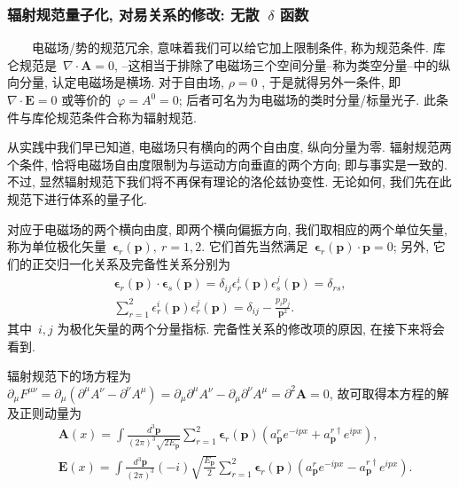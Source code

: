 \subsubsection{辐射规范量子化, 对易关系的修改: 无散~$\delta$ 函数}

~~~~电磁场/势的规范冗余, 意味着我们可以给它加上限制条件, 称为规范条件. 库仑规范是~$\nabla\cdot\bm{A}=0$, --这相当于排除了电磁场三个空间分量--称为类空分量--中的纵向分量, 认定电磁场是横场. 对于自由场, $\rho=0$ , 于是就得另外一条件, 即~$\nabla\cdot\bm{E}=0$ 或等价的~$\varphi=A^0=0$; 后者可名为为电磁场的类时分量/标量光子. 此条件与库伦规范条件合称为辐射规范.


从实践中我们早已知道, 电磁场只有横向的两个自由度, 纵向分量为零. 辐射规范两个条件, 恰将电磁场自由度限制为与运动方向垂直的两个方向; 即与事实是一致的. 不过, 显然辐射规范下我们将不再保有理论的洛伦兹协变性. 无论如何, 我们先在此规范下进行体系的量子化.

对应于电磁场的两个横向由度, 即两个横向偏振方向, 我们取相应的两个单位矢量, 称为单位极化矢量~$\bm{\epsilon}_r(\bm{p}),~r=1,2$. 它们首先当然满足~$\bm{\epsilon}_r(\bm{p})\cdot\bm{p}=0$; 另外, 它们的正交归一化关系及完备性关系分别为
\begin{gather}
\bm{\epsilon}_r(\bm{p})\cdot\bm{\epsilon}_s(\bm{p})=\delta_{ij}\epsilon^i_r(\bm{p})\epsilon^j_s(\bm{p})=\delta_{rs},\\
\sum_{r=1}^2\epsilon^i_r(\bm{p})\epsilon^j_r(\bm{p})=\delta_{ij}-\frac{p_ip_j}{\bm{p}^2}.
\end{gather}
其中~$i,j$ 为极化矢量的两个分量指标. 完备性关系的修改项的原因, 在接下来将会看到.

辐射规范下的场方程为~$\partial_\mu F^{\mu\nu}=\partial_\mu(\partial^\mu A^\nu-\partial^\nu A^\mu)=\partial_\mu\partial^\mu A^\nu-\partial_\mu\partial^\nu A^\mu=\partial^2\bm{A}=0$, 故可取得本方程的解及正则动量为
\begin{align}
&\bm{A}(x)=\int\frac{d^3\bm{p}}{(2\pi)^3\sqrt{2E_{\bm{p}}}}\sum_{r=1}^2\bm{\epsilon}_r(\bm{p})\left(a^r_{\bm{p}}e^{-ipx}+a^{r\dag}_{\bm{p}}e^{ipx}\right),\\
&\bm{E}(x)=\int\frac{d^3\bm{p}}{(2\pi)^3}(-i)\sqrt{\frac{E_{\bm{p}}}{2}}\sum_{r=1}^2\bm{\epsilon}_r(\bm{p})\left(a^r_{\bm{p}}e^{-ipx}-a^{r\dag}_{\bm{p}}e^{ipx}\right).
\end{align}


